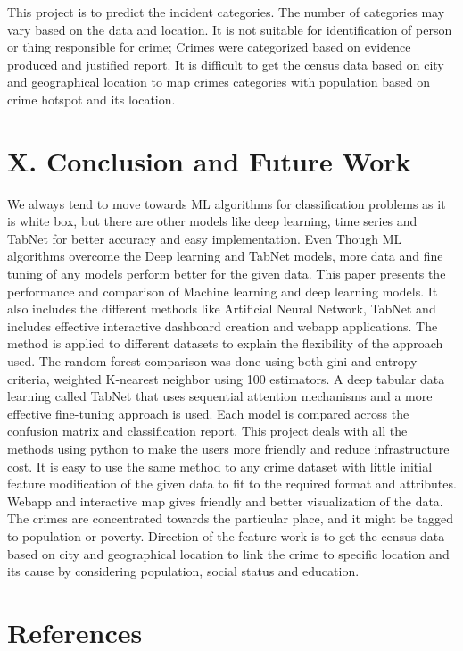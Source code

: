 \documentclass[conference,final, 10pt]{IEEEtran}
\begin{document}
This project is to predict the incident categories. The number of
categories may vary based on the data and location. It is not suitable
for identification of person or thing responsible for crime; Crimes were
categorized based on evidence produced and justified report. It is
difficult to get the census data based on city and geographical location
to map crimes categories with population based on crime hotspot and its
location.

\section{X. Conclusion and Future
Work}\label{x.-conclusion-and-future-work}

We always tend to move towards ML algorithms for classification problems
as it is white box, but there are other models like deep learning, time
series and TabNet for better accuracy and easy implementation. Even
Though ML algorithms overcome the Deep learning and TabNet models, more
data and fine tuning of any models perform better for the given data.
This paper presents the performance and comparison of Machine learning
and deep learning models. It also includes the different methods like
Artificial Neural Network, TabNet and includes effective interactive
dashboard creation and webapp applications. The method is applied to
different datasets to explain the flexibility of the approach used. The
random forest comparison was done using both gini and entropy criteria,
weighted K-nearest neighbor using 100 estimators. A deep tabular data
learning called TabNet that uses sequential attention mechanisms and a
more effective fine-tuning approach is used. Each model is compared
across the confusion matrix and classification report. This project
deals with all the methods using python to make the users more friendly
and reduce infrastructure cost. It is easy to use the same method to any
crime dataset with little initial feature modification of the given data
to fit to the required format and attributes. Webapp and interactive map
gives friendly and better visualization of the data. The crimes are
concentrated towards the particular place, and it might be tagged to
population or poverty. Direction of the feature work is to get the
census data based on city and geographical location to link the crime to
specific location and its cause by considering population, social status
and education.

\section*{References}\label{references}
\end{document}
